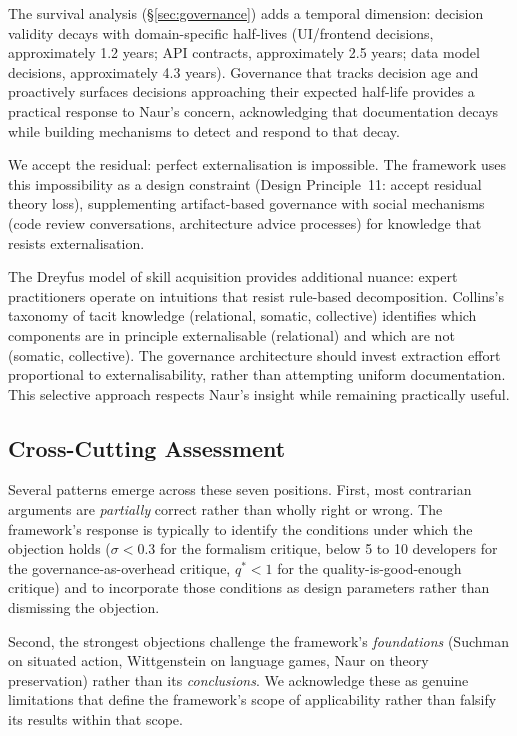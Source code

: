 \documentclass[11pt, a4paper]{googledeepmind}
\begin{document}
The survival analysis (\S\ref{sec:governance}) adds a temporal dimension: decision validity decays with domain-specific half-lives (UI/frontend decisions, approximately 1.2 years; API contracts, approximately 2.5 years; data model decisions, approximately 4.3 years). Governance that tracks decision age and proactively surfaces decisions approaching their expected half-life provides a practical response to Naur's concern, acknowledging that documentation decays while building mechanisms to detect and respond to that decay.

We accept the residual: perfect externalisation is impossible. The framework uses this impossibility as a design constraint (Design Principle~11: accept residual theory loss), supplementing artifact-based governance with social mechanisms (code review conversations, architecture advice processes) for knowledge that resists externalisation.

The Dreyfus model of skill acquisition provides additional nuance: expert
practitioners operate on intuitions that resist rule-based decomposition.
Collins's taxonomy of tacit knowledge (relational, somatic, collective)
identifies which components are in principle externalisable (relational) and
which are not (somatic, collective).  The governance architecture should invest
extraction effort proportional to externalisability, rather than attempting
uniform documentation.  This selective approach respects Naur's insight while
remaining practically useful.


\subsection{Cross-Cutting Assessment}

Several patterns emerge across these seven positions.  First, most contrarian
arguments are \emph{partially} correct rather than wholly right or wrong.  The
framework's response is typically to identify the conditions under which the
objection holds ($\sigma < 0.3$ for the formalism critique, below 5 to 10
developers for the governance-as-overhead critique, $q^* < 1$ for the
quality-is-good-enough critique) and to incorporate those conditions as design
parameters rather than dismissing the objection.

Second, the strongest objections challenge the framework's \emph{foundations}
(Suchman on situated action, Wittgenstein on language games, Naur on
theory preservation) rather than its \emph{conclusions}.  We acknowledge these
as genuine limitations that define the framework's scope of applicability rather
than falsify its results within that scope.
\end{document}
